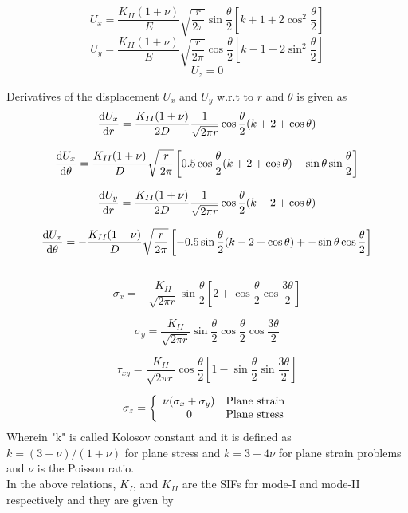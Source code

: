 \documentclass[fleqn, 12.5pt,a4paper]{report}
\newcommand\tab[1][1cm]{\hspace*{#1}}
\begin{document}
\subsection{\color{Black}{Auxiliary displacements for mode-II}}
\vspace{0.5cm}
$$U_x = \frac{K_{II}(1+\nu)}{E} \sqrt{\frac{r}{2\pi}} \sin\frac{\theta}{2} \left[k+1+2\cos^2\frac{\theta}{2} \right]$$\vspace{0.1cm}
$$U_y = \frac{K_{II}(1+\nu)}{E} \sqrt{\frac{r}{2\pi}} \cos\frac{\theta}{2} \left[k-1-2\sin^2\frac{\theta}{2} \right]$$\vspace{0.1cm}
$$U_z = 0$$

Derivatives of the displacement $U_x$ and $U_y$ w.r.t to $r$ and $\theta$ \cite{nagashima2003stress} is given as
$$\dv{U_x}{r} = \frac{K_{II}(1+\nu)}{2D} \frac{1}{\sqrt{2\pi r}} \cos\frac{\theta}{2} (k+2+\cos\theta)$$

$$\dv{U_x}{\theta} = \frac{K_{II}(1+\nu)}{D} \sqrt{\frac{r}{2\pi}} \left[0.5\cos\frac{\theta}{2} (k+2+\cos\theta) - \sin\theta \sin\frac{\theta}{2} \right]$$

$$\dv{U_y}{r} = \frac{K_{II}(1+\nu)}{2D} \frac{1}{\sqrt{2\pi r}} \cos\frac{\theta}{2} (k-2+\cos\theta)$$

$$\dv{U_x}{\theta} = -\frac{K_{II}(1+\nu)}{D} \sqrt{\frac{r}{2\pi}} \left[-0.5\sin\frac{\theta}{2} (k-2+\cos\theta) +- \sin\theta \cos\frac{\theta}{2} \right]$$\vspace{0.2cm}

\subsection{\color{Black}{Auxiliary stresses for mode-II}}\cite{ahmed2009extended}

$$\sigma_{x} = -\frac{K_{II}}{\sqrt{2\pi r}} \sin\frac{\theta}{2} \left[2+\cos\frac{\theta}{2} \cos\frac{3\theta}{2}\right]$$ 

$$\sigma_{y} = \frac{K_{II}}{\sqrt{2\pi r}} \sin\frac{\theta}{2} \cos\frac{\theta}{2} \cos\frac{3\theta}{2}$$ 

$$\tau_{xy} = \frac{K_{II}}{\sqrt{2\pi r}} \cos\frac{\theta}{2} \left[1-\sin\frac{\theta}{2} \sin\frac{3\theta}{2}\right]$$ 

$$
\sigma_{z} = 
\left\{
\begin{array}{ll}
\nu(\sigma_x + \sigma_y) & \mbox{Plane strain}\\
\tab[0.75cm] 0 & \mbox{Plane stress}\\
\end{array}
\right.
$$
Wherein "k" is called Kolosov constant and it is defined as $k=(3-\nu)/(1+\nu)$ for plane stress and $k=3-4\nu$ for plane strain problems and $\nu$ is the Poisson ratio.
\\
In the above relations, $K_{I}$, and $K_{II}$ are the SIFs for mode-I and mode-II respectively and they are given by
\end{document}
